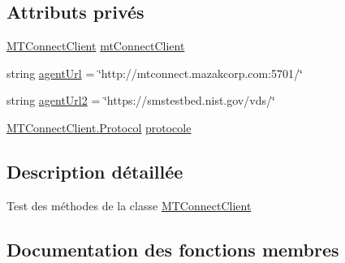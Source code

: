\subsection*{Attributs privés}
\begin{DoxyCompactItemize}
\item 
\mbox{\hyperlink{class_m_t_connect_agent_1_1_b_l_l_1_1_m_t_connect_client}{M\+T\+Connect\+Client}} \mbox{\hyperlink{class_m_t_connect_agent_1_1_b_l_l_1_1_tests_1_1_m_t_connect_client_tests_af4b9a9b854925f636589f1487f0d95cb}{mt\+Connect\+Client}}
\item 
string \mbox{\hyperlink{class_m_t_connect_agent_1_1_b_l_l_1_1_tests_1_1_m_t_connect_client_tests_afbdadd2af552ebc1f2953ad599363876}{agent\+Url}} = \char`\"{}http\+://mtconnect.\+mazakcorp.\+com\+:5701/\char`\"{}
\item 
string \mbox{\hyperlink{class_m_t_connect_agent_1_1_b_l_l_1_1_tests_1_1_m_t_connect_client_tests_ac66f82b312e893fc44914f5c7a83b42b}{agent\+Url2}} = \char`\"{}https\+://smstestbed.\+nist.\+gov/vds/\char`\"{}
\item 
\mbox{\hyperlink{class_m_t_connect_agent_1_1_b_l_l_1_1_m_t_connect_client_a2f390f74a0ad3ee5147e9438ceed6474}{M\+T\+Connect\+Client.\+Protocol}} \mbox{\hyperlink{class_m_t_connect_agent_1_1_b_l_l_1_1_tests_1_1_m_t_connect_client_tests_a102f3253321c2caeabab74fbf403309d}{protocole}}
\end{DoxyCompactItemize}


\subsection{Description détaillée}
Test des méthodes de la classe \mbox{\hyperlink{class_m_t_connect_agent_1_1_b_l_l_1_1_m_t_connect_client}{M\+T\+Connect\+Client}} 



\subsection{Documentation des fonctions membres}
\mbox{\label{class_m_t_connect_agent_1_1_b_l_l_1_1_tests_1_1_m_t_connect_client_tests_a2ce138d6c1d226d4ce5b58d6b16846fa}} 
